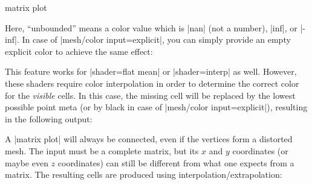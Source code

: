 {\begin{plottype}[/pgfplots]{matrix plot}
\begin{codeexample}[]
\end{codeexample}
	Here, ``unbounded'' means a color value which is |nan| (not a number), |inf|, or |-inf|. In case of |mesh/color input=explicit|, you can simply provide an empty explicit color to achieve the same effect:
\begin{codeexample}[]
\end{codeexample}
	This feature works for |shader=flat mean| or |shader=interp| as well. However, these shaders require color interpolation in order to determine the correct color for the \emph{visible} cells. In this case, the missing cell will be replaced by the lowest possible point meta (or by black in case of |mesh/color input=explicit|), resulting in the following output:
\begin{codeexample}[]
\end{codeexample}

    A |matrix plot| will always be connected, even if the vertices form a distorted mesh. The input must be a complete matrix, but its $x$ and $y$ coordinates (or maybe even $z$ coordinates) can still be different from what one expects from a matrix. The resulting cells are produced using interpolation/extrapolation:
\begin{codeexample}[]
\begin{tikzpicture}
\begin{axis}[enlargelimits=0.2,colorbar]


\end{axis}
\end{tikzpicture}
\end{codeexample}
\end{plottype}}
